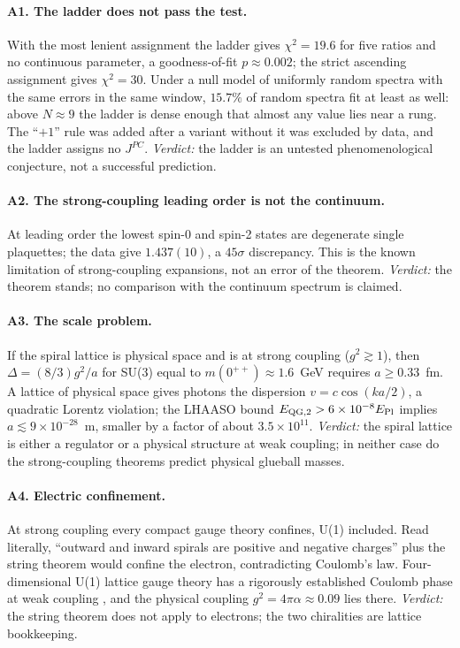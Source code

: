 \documentclass[aps,prd,preprint,superscriptaddress,amsmath,amssymb]{revtex4-2}
\begin{document}
\paragraph{A1. The ladder does not pass the test.}  With the most lenient
assignment the ladder gives $\chi^2=19.6$ for five ratios and no continuous
parameter, a goodness-of-fit $p\approx0.002$; the strict ascending assignment
gives $\chi^2=30$.  Under a null model of uniformly random spectra with the
same errors in the same window, $15.7\%$ of random spectra fit at least as
well: above $N\approx9$ the ladder is dense enough that almost any value lies
near a rung.  The ``$+1$'' rule was added after a variant without it was
excluded by data, and the ladder assigns no $J^{PC}$.  \emph{Verdict:} the
ladder is an untested phenomenological conjecture, not a successful
prediction.

\paragraph{A2. The strong-coupling leading order is not the continuum.}  At
leading order the lowest spin-0 and spin-2 states are degenerate single
plaquettes; the data give $1.437(10)$, a $45\sigma$ discrepancy.  This is the
known limitation of strong-coupling expansions, not an error of the theorem.
\emph{Verdict:} the theorem stands; no comparison with the continuum spectrum
is claimed.

\paragraph{A3. The scale problem.}  If the spiral lattice is physical space
and is at strong coupling ($g^2\gtrsim1$), then $\Delta=(8/3)g^2/a$ for SU(3)
equal to $m(0^{++})\approx1.6$~GeV requires $a\ge0.33$~fm.  A lattice of
physical space gives photons the dispersion $v=c\cos(ka/2)$, a quadratic
Lorentz violation; the LHAASO bound $E_{\rm QG,2}>6\times10^{-8}E_{\rm Pl}$
\cite{lhaaso2024liv} implies $a\lesssim9\times10^{-28}$~m, smaller by a factor
of about $3.5\times10^{11}$.  \emph{Verdict:} the spiral lattice is either a
regulator or a physical structure at weak coupling; in neither case do the
strong-coupling theorems predict physical glueball masses.

\paragraph{A4. Electric confinement.}  At strong coupling every compact gauge
theory confines, U(1) included.  Read literally, ``outward and inward spirals
are positive and negative charges'' plus the string theorem would confine the
electron, contradicting Coulomb's law.  Four-dimensional U(1) lattice gauge
theory has a rigorously established Coulomb phase at weak coupling
\cite{guth1980existence,frohlich1982massless}, and the physical coupling
$g^2=4\pi\alpha\approx0.09$ lies there.  \emph{Verdict:} the string theorem
does not apply to electrons; the two chiralities are lattice bookkeeping.
\end{document}
